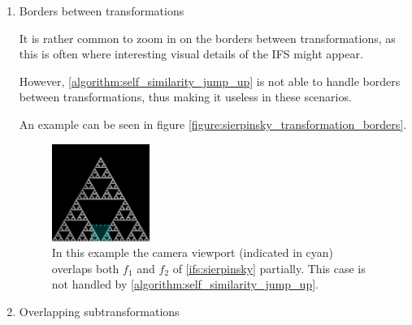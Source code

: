 \documentclass[11pt]{article}
\begin{document}
\begin{enumerate}
\item Borders between transformations
\label{sec:org67836f4}

It is rather common to zoom in on the borders between transformations, as this is often
where interesting visual details of the IFS might appear.

However, \autoref{algorithm:self_similarity_jump_up} is not able to handle borders between transformations,
thus making it useless in these scenarios.

An example can be seen in figure \autoref{figure:sierpinsky_transformation_borders}.

\begin{figure}
\centering
\includegraphics[width=0.3\textwidth]{figures/sierpinsky_transformation_borders}
\caption{In this example the camera viewport (indicated in cyan) overlaps both $f_1$ and $f_2$ of \autoref{ifs:sierpinsky} partially. This case is not handled by \autoref{algorithm:self_similarity_jump_up}. }
\label{figure:sierpinsky_transformation_borders}
\end{figure}

\item Overlapping subtransformations
\label{sec:orgd1048e2}


\end{enumerate}
\end{document}
